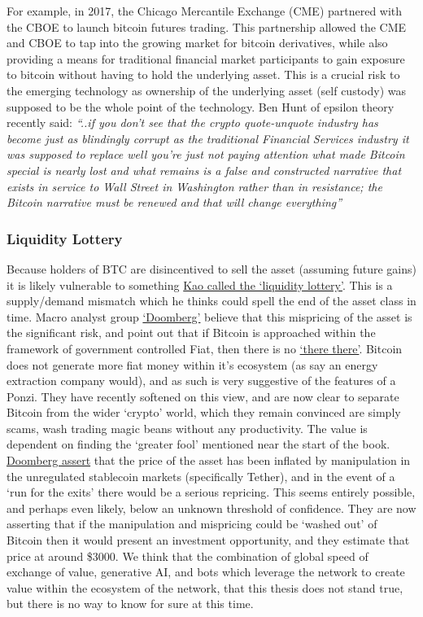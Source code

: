 For example, in 2017, the Chicago Mercantile Exchange (CME) partnered with the CBOE to launch bitcoin futures trading. This partnership allowed the CME and CBOE to tap into the growing market for bitcoin derivatives, while also providing a means for traditional financial market participants to gain exposure to bitcoin without having to hold the underlying asset. This is a crucial risk to the emerging technology as ownership of the underlying asset (self custody) was supposed to be the whole point of the technology. Ben Hunt of epsilon theory recently said: \textit{``..if you don't see that the crypto quote-unquote industry has become just as blindingly corrupt as the traditional Financial Services industry it was supposed to replace well you're just not paying attention what made Bitcoin special is nearly lost and what remains is a false and constructed narrative that exists in service to Wall Street in Washington rather than in resistance; the Bitcoin narrative must be renewed and that will change everything''}
\subsubsection{Liquidity Lottery}
Because holders of BTC are disincentived to sell the asset (assuming future gains) it is likely vulnerable to something \href{https://twitter.com/UrbanKaoboy/status/1526311908709502977}{Kao called the `liquidity lottery'}. This is a supply/demand mismatch which he thinks could spell the end of the asset class in time. Macro analyst group \href{https://doomberg.substack.com/}{`Doomberg'} believe that this mispricing of the asset is the significant risk, and point out that if Bitcoin is approached within the framework of government controlled Fiat, then there is no \href{https://en.wiktionary.org/wiki/there_is_no_there_there}{`there there'}. Bitcoin does not generate more fiat money within it's ecosystem (as say an energy extraction company would), and as such is very suggestive of the features of a Ponzi. They have recently softened on this view, and are now clear to separate Bitcoin from the wider `crypto' world, which they remain convinced are simply scams, wash trading magic beans without any productivity. The value is dependent on finding the `greater fool' mentioned near the start of the book. \href{https://doomberg.substack.com/p/dollars-ex-machina}{Doomberg assert} that the price of the asset has been inflated by manipulation in the unregulated stablecoin markets (specifically Tether), and in the event of a `run for the exits' there would be a serious repricing. This seems entirely possible, and perhaps even likely, below an unknown threshold of confidence. They are now asserting that if the manipulation and mispricing could be `washed out' of Bitcoin then it would present an investment opportunity, and they estimate that price at around \$3000. We think that the combination of global speed of exchange of value, generative AI, and bots which leverage the network to create value within the ecosystem of the network, that this thesis does not stand true, but there is no way to know for sure at this time.
